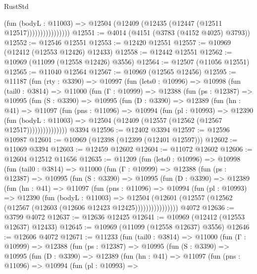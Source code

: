 \begin{lexlean}{RustStd}
\begin{coremodule}
                          (fun (bodyL : @11003) =>
                          @12504 (@12409 (@12435 (@12447 (@12511 @12517))))))))))))))))
@12551 := @4014 (@4151 (@3783 (@4152 @4025) @3793))
@12552 := @12546 @12551
@12553 := @12420 @12551
@12557 := @10969 (@12412 (@12553 @12426) @12433)
@12558 := @12442 @12551
@12562 := @10969 (@11099 (@12558 @12426) @3556)
@12564 := @12507 (@11056 @12551)
@12565 := @11040 @12564
@12567 := @10969 (@12565 @12456)
@12595 := @11187
    (fun (rty : @3390) =>
    @10997
      (fun (lets0 : @10996) =>
      @10998
        (fun (tail0 : @3814) =>
        @11000
          (fun (Γ : @10999) =>
          @12388
            (fun (ps : @12387) =>
            @10995
              (fun (S : @3390) =>
              @10995
                (fun (D : @3390) =>
                @12389
                  (fun (hn : @41) =>
                  @11097
                    (fun (pns : @11096) =>
                    @10994
                      (fun (pl : @10993) =>
                      @12390
                        (fun (bodyL : @11003) =>
                        @12504 (@12409 (@12557 (@12562 (@12567 @12517)))))))))))))))
    @3394
@12596 := @12402 @3394
@12597 := @12596 @10987
@12601 := @10969 (@12398 (@12399 (@12401 @12597)))
@12602 := @11069 @3394
@12603 := @12459 @12602
@12604 := @11072 @12602
@12606 := @12604 @12512 @11656
@12635 := @11209
    (fun (lets0 : @10996) =>
    @10998
      (fun (tail0 : @3814) =>
      @11000
        (fun (Γ : @10999) =>
        @12388
          (fun (ps : @12387) =>
          @10995
            (fun (S : @3390) =>
            @10995
              (fun (D : @3390) =>
              @12389
                (fun (hn : @41) =>
                @11097
                  (fun (pns : @11096) =>
                  @10994
                    (fun (pl : @10993) =>
                    @12390
                      (fun (bodyL : @11003) =>
                      @12504
                        (@12601
                          (@12557 (@12562 (@12567 (@12603 (@12606 @12423 @12425))))))))))))))))
    @4072
@12636 := @3799 @4072
@12637 := @12636 @12425
@12641 := @10969 (@12412 (@12553 @12637) @12433)
@12645 := @10969 (@11099 (@12558 @12637) @3556)
@12646 := @12606 @4072
@12671 := @11233
    (fun (tail0 : @3814) =>
    @11000
      (fun (Γ : @10999) =>
      @12388
        (fun (ps : @12387) =>
        @10995
          (fun (S : @3390) =>
          @10995
            (fun (D : @3390) =>
            @12389
              (fun (hn : @41) =>
              @11097
                (fun (pns : @11096) =>
                @10994
                  (fun (pl : @10993) =>

\end{coremodule}
\end{lexlean}
